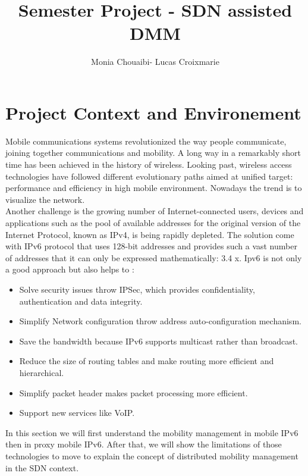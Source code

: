 \documentclass{article}
\title{Semester Project - SDN assisted DMM }
\author{Monia Chouaibi- Lucas Croixmarie}
\begin{document}
\maketitle
\newpage
\tableofcontents
\newpage
\part{Project Context and Environement}

Mobile communications systems revolutionized the way people
communicate, joining together communications and mobility. A long way
in a remarkably short time has been achieved in the history of
wireless.  Looking past, wireless access technologies have followed
different evolutionary paths aimed at unified target: performance and
efficiency in high mobile environment. Nowadays the trend is to
visualize the network.\\ 
Another challenge is the growing number of Internet-connected users,
devices and applications such as the pool of available addresses for
the original version of the Internet Protocol, known as IPv4, is being
rapidly depleted. The solution come with IPv6 protocol that uses
128-bit addresses and provides such a vast number of addresses that it
can only be expressed mathematically: 3.4 x. Ipv6 is not only a good
approach but also helps to :

\begin{itemize}

  \item Solve security issues throw IPSec, which provides
    confidentiality, authentication and data integrity.
  \item Simplify Network configuration throw address
    auto-configuration mechanism.
  \item Save the bandwidth because IPv6 supports multicast rather than
    broadcast.
  \item Reduce the size of routing tables and make routing more
    efficient and hierarchical.
  \item Simplify packet header makes packet processing more efficient.
  \item Support new services like VoIP.
\end{itemize}


In this section we will first understand the mobility management in
mobile IPv6 then in proxy mobile IPv6. After that, we will show the
limitations of those technologies to move to explain the concept of
distributed mobility management in the SDN context.
\end{document}
